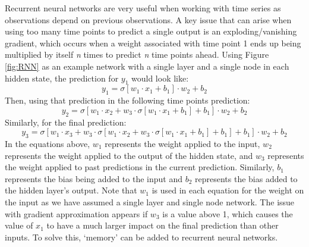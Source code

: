 Recurrent neural networks are very useful when working with time series as observations depend on previous observations. A key issue that can arise when using too many time points to predict a single output is an exploding/vanishing gradient, which occurs when a weight associated with time point 1 ends up being multiplied by itself \textit{n} times to predict \textit{n} time points ahead. Using Figure \ref{fig:RNN} as an example network with a single layer and a single node in each hidden state, the prediction for $y_{1}$ would look like:
\begin{equation*}
    y_1 = \sigma[w_1\cdot x_1 + b_1]\cdot w_2 + b_2
\end{equation*}
Then, using that prediction in the following time points prediction:
\begin{equation*}
    y_2 = \sigma[w_1\cdot x_2 + w_3\cdot\sigma[w_1\cdot x_1 + b_1] + b_1]\cdot w_2 + b_2
\end{equation*}
Similarly, for the final prediction:
\begin{equation*}
    y_3 = \sigma[w_1\cdot x_3 + w_3\cdot \sigma[w_1\cdot x_2 + w_3\cdot\sigma[w_1\cdot x_1 + b_1] + b_1] + b_1]\cdot w_2 + b_2
\end{equation*}
In the equations above, $w_1$ represents the weight applied to the input, $w_2$ represents the weight applied to the output of the hidden state, and $w_3$ represents the weight applied to past predictions in the current prediction. Similarly, $b_1$ represents the bias being added to the input and $b_2$ represents the bias added to the hidden layer's output. Note that $w_1$ is used in each equation for the weight on the input as we have assumed a single layer and single node network. The issue with gradient approximation appears if $w_3$ is a value above 1, which causes the value of $x_1$ to have a much larger impact on the final prediction than other inputs. To solve this, `memory' can be added to recurrent neural networks.